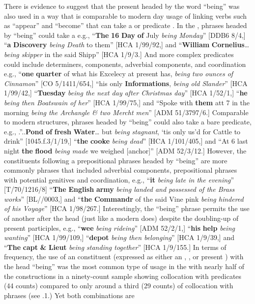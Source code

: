 There is evidence to suggest that the present  headed by the word “being” was also used in a way that is comparable to modern day usage of linking verbs such as “appear” and “become” that can take a  or predicate . In the ,  phrases headed by “being” could take a  e.g., “\textbf{The} \textbf{16} \textbf{Day} \textbf{of} July \textit{being Monday}” [DDB6 8/4,] “\textbf{a} \textbf{Discovery} \textit{being Death} to them” [HCA 1/99/92,] and “\textbf{William} \textbf{Cornelius}…\textit{being skipper} in the said Shipp” [HCA 1/9/3.] And more complex  predicates could include determiners,  components, adverbial components, and coordination e.g., “\textbf{one} \textbf{quarter} of what his Excelecy at present has, \textit{being two ounces of Cinnamon}” [CO 5/1411/654,] “his only \textbf{Informations}, \textit{being old Slander}” [HCA 1/99/42,] “\textbf{Tuesday} \textit{being the next day after Christmas day}” [HCA 1/52/1,] “\textbf{he} \textit{being then Boatswain of her}” [HCA 1/99/75,] and “Spoke with \textbf{them} att 7 in the morning \textit{being the Archangle \& two Mercht men}” [ADM 51/3797/6.] Comparable to modern  structures,  phrases headed by “being” could also take a bare  predicate, e.g., .”..\textbf{Pond} \textbf{of} \textbf{fresh} \textbf{Water}… but \textit{being stagnant}, ‘tis only us’d for Cattle to drink” [1045.f.3/1/19,] “\textbf{the} \textbf{cooke} \textit{being dead}” [HCA 1/101/405,] and “At 6 last night \textbf{the} \textbf{flood} \textit{being made} we weighed [anchor]” [ADM 52/3/12.] However, the  constituents following a prepositional phrases headed by “being” are more commonly  phrases that included adverbial components, prepositional phrases with potential genitives and coordination, e.g., “\textbf{it} \textit{being late in the evening}” [T/70/1216/8] “\textbf{The} \textbf{English} \textbf{army} \textit{being landed and possessed of the Brass works}” [BL/\citealt{Egerton2395}/0003,] and “\textbf{the} \textbf{Commandr} of the said Vine pink \textit{being hindered of his Voyage}” [HCA 1/98/267.] Interestingly, the “being” phrase permits the use of another   after the  head (just like a modern  does) despite the doubling-up of present participles, e.g., “\textbf{wee} \textit{being rideing}” [ADM 52/2/1,] “\textbf{his} \textbf{help} \textit{being wanting}” [HCA 1/99/109,] “\textbf{depot} \textit{being then belonging}” [HCA 1/9/39,] and “\textbf{The} \textbf{capt} \textbf{\&} \textbf{Lieut} \textit{being standing together}” [HCA 1/9/155.] In terms of frequency, the use of an  constituent (expressed as either an , , or present ) with the  head “being” was the most common type of usage in the  with nearly half of the constructions in a ninety-count sample showing collocation with  predicates (44 counts) compared to only around a third (29 counts) of collocation with  phrases (see .1.) Yet both combinations are 